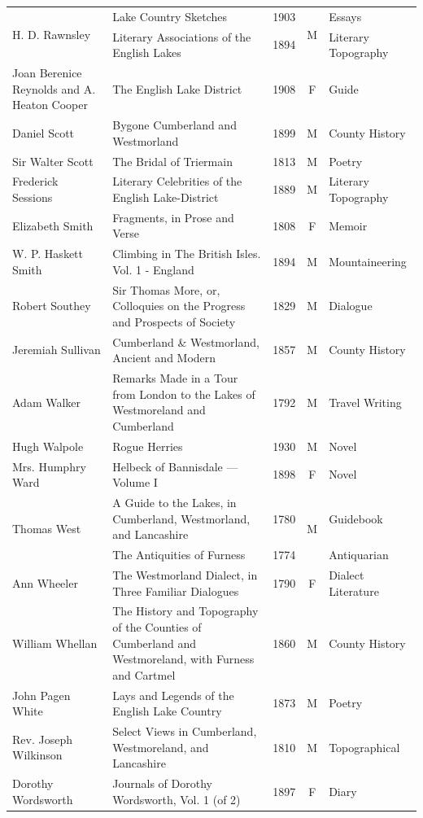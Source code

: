 \begin{longtable}{@{}p{3.2cm} p{5.0cm} c c p{3.2cm}@{}}
\multirow[t]{2}{3.2cm}{H. D. Rawnsley} & Lake Country Sketches & 1903 & \multirow[t]{2}{*}{M} & Essays \\
 & Literary Associations of the English Lakes & 1894 &  & Literary Topography \\
Joan Berenice Reynolds and A. Heaton Cooper & The English Lake District & 1908 & F & Guide \\
Daniel Scott & Bygone Cumberland and Westmorland & 1899 & M & County History \\
Sir Walter Scott & The Bridal of Triermain & 1813 & M & Poetry \\
Frederick Sessions & Literary Celebrities of the English Lake-District & 1889 & M & Literary Topography \\
Elizabeth Smith & Fragments, in Prose and Verse & 1808 & F & Memoir \\
W. P. Haskett Smith & Climbing in The British Isles. Vol. 1 - England & 1894 & M & Mountaineering \\
Robert Southey & Sir Thomas More, or, Colloquies on the Progress and Prospects of Society & 1829 & M & Dialogue \\
Jeremiah Sullivan & Cumberland \& Westmorland, Ancient and Modern & 1857 & M & County History \\
Adam Walker & Remarks Made in a Tour from London to the Lakes of Westmoreland and Cumberland & 1792 & M & Travel Writing \\
Hugh Walpole & Rogue Herries & 1930 & M & Novel \\
Mrs. Humphry Ward & Helbeck of Bannisdale — Volume I & 1898 & F & Novel \\
\multirow[t]{2}{3.2cm}{Thomas West} & A Guide to the Lakes, in Cumberland, Westmorland, and Lancashire & 1780 & \multirow[t]{2}{*}{M} & Guidebook \\
 & The Antiquities of Furness & 1774 &  & Antiquarian \\
Ann Wheeler & The Westmorland Dialect, in Three Familiar Dialogues & 1790 & F & Dialect Literature \\
William Whellan & The History and Topography of the Counties of Cumberland and Westmoreland, with Furness and Cartmel & 1860 & M & County History \\
John Pagen White & Lays and Legends of the English Lake Country & 1873 & M & Poetry \\
Rev. Joseph Wilkinson & Select Views in Cumberland, Westmoreland, and Lancashire & 1810 & M & Topographical \\
Dorothy Wordsworth & Journals of Dorothy Wordsworth, Vol. 1 (of 2) & 1897 & F & Diary \\

\end{longtable}
